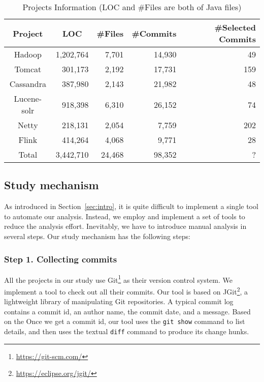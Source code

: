 \begin{table}
	\centering
	\caption{Projects Information (LOC and \#Files are both of Java files)}
    \label{table:dataset}
	\begin{tabular}{|c|r|r|r|r|}\hline
		Project&\multicolumn{1}{|c|}{LOC}&\#Files&\#Commits&\#Selected Commits\\\hline
		Hadoop&1,202,764&7,701&14,930&49\\
		Tomcat&301,173&2,192&17,731&159\\
		Cassandra&387,980&2,143&21,982&48\\
		Lucene-solr&918,398&6,310&26,152&74\\
		Netty&218,131&2,054&7,759&202\\
		Flink&414,264&4,068&9,771&28\\\hline
		Total&3,442,710&24,468&98,352&?\\\hline
	\end{tabular}
\end{table}

\subsection{Study mechanism}
\label{sec:method:tool}
As introduced in Section~\ref{sec:intro}, it is quite difficult to implement a single tool to automate our analysis. Instead, we employ and implement a set of tools to reduce the analysis effort. Inevitably, we have to introduce manual analysis in several steps. Our study mechanism has the following steps:

\subsubsection{Step 1. Collecting commits} All the projects in our study use Git\footnote{\url{https://git-scm.com/}} as their version control system. We implement a tool to check out all their commits. Our tool is based on JGit\footnote{\url{https://eclipse.org/jgit/}}, a lightweight library of manipulating Git repositories. A typical commit log contains a commit id, an author name, the commit date, and a message. Based on the Once we get a commit id, our tool uses the \texttt{git show} command to list details, and then uses the textual \texttt{diff} command to produce its change hunks.

